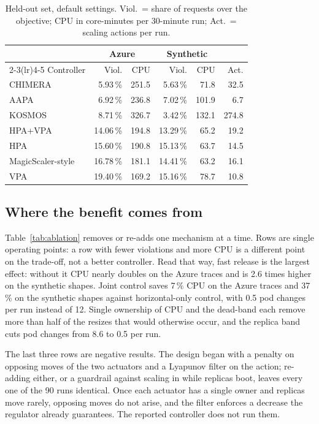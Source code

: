 \documentclass[conference]{IEEEtran}
\begin{document}
\begin{table}[t]
\caption{Held-out set, default settings. Viol.\ = share of requests over the objective;
CPU in core-minutes per 30-minute run; Act.\ = scaling actions per run.}
\label{tab:default}
\centering
\setlength{\tabcolsep}{3.5pt}
\begin{tabular}{@{}lrrrrr@{}}
\toprule
 & \multicolumn{2}{c}{Azure} & \multicolumn{2}{c}{Synthetic} & \\
\cmidrule(lr){2-3}\cmidrule(lr){4-5}
Controller & Viol. & CPU & Viol. & CPU & Act. \\
\midrule
CHIMERA & 5.93\,\% & 251.5 & 5.63\,\% & 71.8 & 32.5 \\
AAPA & 6.92\,\% & 236.8 & 7.02\,\% & 101.9 & 6.7 \\
KOSMOS & 8.71\,\% & 326.7 & 3.42\,\% & 132.1 & 274.8 \\
HPA+VPA & 14.06\,\% & 194.8 & 13.29\,\% & 65.2 & 19.2 \\
HPA & 15.60\,\% & 190.8 & 15.13\,\% & 63.7 & 14.5 \\
MagicScaler-style & 16.78\,\% & 181.1 & 14.41\,\% & 63.2 & 16.1 \\
VPA & 19.40\,\% & 169.2 & 15.16\,\% & 78.7 & 10.8 \\
\bottomrule
\end{tabular}
\end{table}

\subsection{Where the benefit comes from}

Table~\ref{tab:ablation} removes or re-adds one mechanism at a time. Rows are single
operating points: a row with fewer violations and more CPU is a different point on the
trade-off, not a better controller. Read that way, fast release is the largest effect:
without it CPU nearly doubles on the Azure traces and is 2.6 times higher on the synthetic
shapes. Joint control saves 7\,\% CPU on the Azure traces and 37\,\% on the synthetic
shapes against horizontal-only control, with 0.5 pod changes per run instead of 12. Single
ownership of CPU and the dead-band each remove more than half of the resizes that would
otherwise occur, and the replica band cuts pod changes from 8.6 to 0.5 per run.

The last three rows are negative results. The design began with a penalty on opposing
moves of the two actuators and a Lyapunov filter on the action; re-adding either, or a
guardrail against scaling in while replicas boot, leaves every one of the 90 runs
identical. Once each actuator has a single owner and replicas move rarely, opposing moves
do not arise, and the filter enforces a decrease the regulator already guarantees. The
reported controller does not run them.
\end{document}
